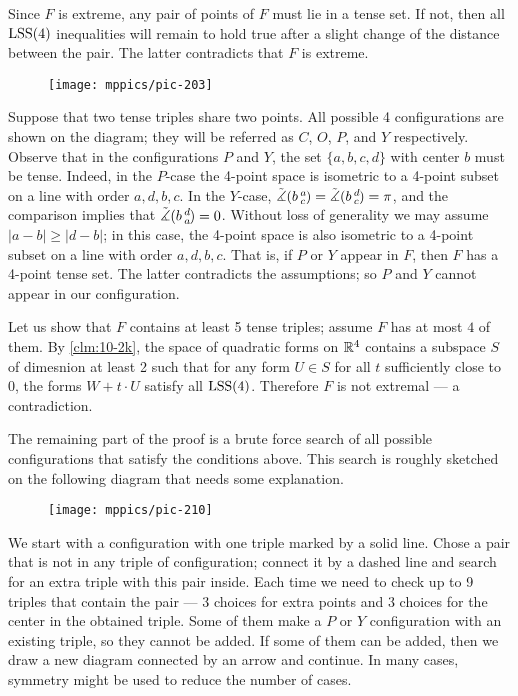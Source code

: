 \documentclass{article}
\begin{document}
Since $F$ is extreme, any pair of points of $F$ must lie in a tense set.
If not, then all $\mathrm{LSS}(4)$ inequalities will remain to hold true after a slight change of the distance between the pair.
The latter contradicts that $F$ is extreme.

\begin{wrapfigure}[5]{l}{60mm}
\vskip-2mm
\centering
\texttt{[image: mppics/pic-203]}
\label{page:COPY}
\end{wrapfigure}

Suppose that two tense triples share two points.
All possible 4 configurations are shown on the diagram; they will be referred as $C$, $O$, $P$, and $Y$ respectively.
Observe that in the configurations $P$ and $Y$, the set $\{a,b,c,d\}$ with center $b$ must be tense.
Indeed, in the $P$-case the 4-point space is isometric to a 4-point subset on a line with order $a,d,b,c$.
In the $Y$-case, $\tilde\measuredangle(b\,{}^{a}_{c}\hspace{-0.2ex})=\tilde\measuredangle(b\,{}^{d}_{c}\hspace{-0.2ex})=\pi$, and the comparison implies that $\tilde\measuredangle(b\,{}^{d}_{a}\hspace{-0.2ex})=0$.
Without loss of generality we may assume $|a-b|\ge |d-b|$;
in this case, the 4-point space is also isometric to a 4-point subset on a line with order $a,d,b,c$.
That is, if $P$ or $Y$ appear in $F$, then $F$ has a 4-point tense set.
The latter contradicts the assumptions; so $P$ and $Y$ cannot appear in our configuration.

Let us show that $F$ contains at least 5 tense triples;
assume $F$ has at most $4$ of them.
By \ref{clm:10-2k}, the space of quadratic forms on $\mathbb{R}^4$ contains a subspace $S$ of dimesnion at least 2 such that for any form $U\in S$ for all $t$ sufficiently close to 0, the forms $W+t\cdot U$ satisfy all $\mathrm{LSS}(4)$.
Therefore $F$ is not extremal --- a contradiction.

The remaining part of the proof is a brute force search of all possible configurations that satisfy the conditions above.
This search is roughly sketched on the following diagram that needs some explanation.
\begin{figure}[ht!]
\centering
\texttt{[image: mppics/pic-210]}
\end{figure}
We start with a configuration with one triple marked by a solid line.
Chose a pair that is not in any triple of configuration;
connect it by a dashed line and search for an extra triple with this pair inside.
Each time we need to check up to 9 triples that contain the pair --- 3 choices for extra points and 3 choices for the center in the obtained triple.
Some of them make a $P$ or $Y$ configuration with an existing triple, so they cannot be added.
If some of them can be added, then we draw a new diagram connected by an arrow and continue.
In many cases, symmetry might be used to reduce the number of cases.
 
\end{document}
